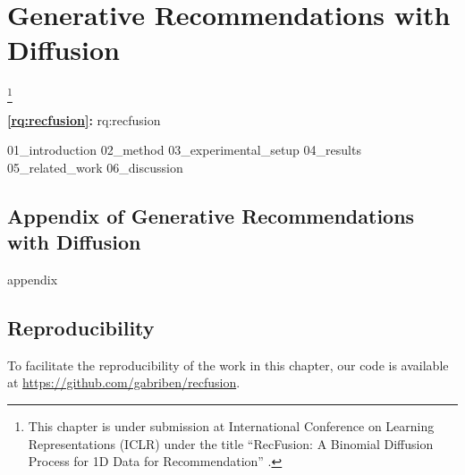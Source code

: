
\acresetall

\chapter{Generative Recommendations with Diffusion}
\label{chapter:research-recfusion}

\footnote[]{This chapter is under submission at International Conference on Learning Representations (ICLR) under the title ``RecFusion: A Binomial Diffusion Process for 1D Data for Recommendation'' \citep{lucic2021cfgnnexplainer}.}
\acresetall


\medskip
\noindent
\textbf{\ref{rq:recfusion}:} \acl{rq:recfusion}
\medskip

\noindent

{01_introduction}
{02_method}
{03_experimental_setup}
{04_results}
{05_related_work}
{06_discussion}

\begin{appendices}
\chapter{Appendix of Generative Recommendations with Diffusion}
{appendix}
\end{appendices}

%

%

%
%
%
%
%
%
%
%
%



\section*{Reproducibility}
To facilitate the reproducibility of the work in this chapter, our code is available at \url{https://github.com/gabriben/recfusion}.









